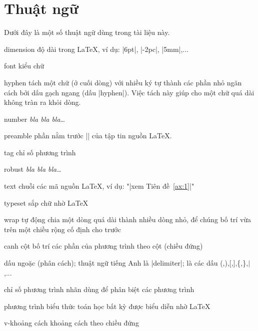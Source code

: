 \ifx\printversion\undefined
	\newpage
\else
	\cleardoublepage
\fi

\tableofcontents

\cleardoublepage %



\chapter{Thuật ngữ}

Dưới đây là một số thuật ngữ dùng trong tài liệu này.

\medskip
\begin{lentry}
\item[dimension] độ dài trong \LaTeX{}, ví dụ: |6pt|, |-2pc|, |5mm|,...
\item[font]kiểu chữ
\item[hyphen]tách một chữ (ở cuối dòng) với nhiều ký tự thành các phần nhỏ
	ngăn cách bởi dấu gạch ngang (dấu |hyphen|).
	Việc tách này giúp cho một chữ quá dài không tràn ra khỏi dòng.
\item[number] \emph{bla bla bla\ldots}
\item[preamble] phần nằm trước || của tập tin nguồn \LaTeX{}.
\item[tag] chỉ số phương trình
\item[robust]\emph{bla bla bla\ldots}
\item[text] chuỗi các mã nguồn \LaTeX{}, ví dụ: "|xem Tiên đề~\ref{ax:1}|"
\item[typeset] sắp chữ nhờ \LaTeX{}
\item[wrap] tự động chia một dòng quá dài thành nhiều dòng nhỏ, để chúng
	bố trí vừa trên một chiều rộng cố định cho trước
\item[canh cột]bố trí các phần của phương trình theo cột (chiều đứng)
\item[dấu ngoặc](phân cách); thuật ngữ tiếng Anh là |delimiter|; là các dấu
	(,),[,],\{,\},$\vert$,...
\item[chỉ số phương trình]nhãn dùng để phân biệt các phương trình
\item[phương trình] biểu thức toán học bất kỳ được biểu diễn nhờ \LaTeX{}
\item[v-khoảng cách] khoảng cách theo chiều đứng
\end{lentry}

